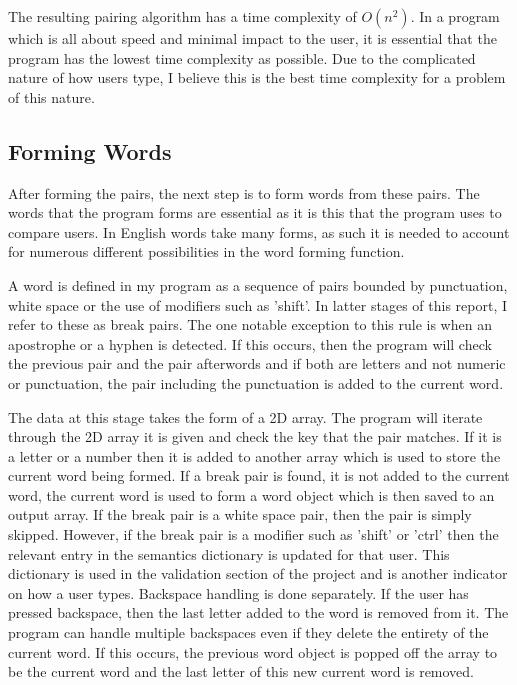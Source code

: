 \documentclass[10pt,a4paper]{report}
\begin{document}
The resulting pairing algorithm has a time complexity of \(O(n^2)\). In a program which is all about speed and minimal impact to the user, it is essential that the program has the lowest time complexity as possible. Due to the complicated nature of how users type, I believe this is the best time complexity for a problem of this nature.

\subsection{Forming Words}

After forming the pairs, the next step is to form words from these pairs. The words that the program forms are essential as it is this that the program uses to compare users. In English words take many forms, as such it is needed to account for numerous different possibilities in the word forming function.

A word is defined in my program as a sequence of pairs bounded by punctuation, white space or the use of modifiers such as 'shift'. In latter stages of this report, I refer to these as break pairs. The one notable exception to this rule is when an apostrophe or a hyphen is detected. If this occurs, then the program will check the previous pair and the pair afterwords and if both are letters and not numeric or punctuation, the pair including the punctuation is added to the current word. 

The data at this stage takes the form of a 2D array. The program will iterate through the 2D array it is given and check the key that the pair matches. If it is a letter or a number then it is added to another array which is used to store the current word being formed. If a break pair is found, it is not added to the current word, the current word is used to form a word object which is then saved to an output array. If the break pair is a white space pair, then the pair is simply skipped. However, if the break pair is a modifier such as 'shift' or 'ctrl' then the relevant entry in the semantics dictionary is updated for that user. This dictionary is used in the validation section of the project and is another indicator on how a user types. Backspace handling is done separately. If the user has pressed backspace, then the last letter added to the word is removed from it. The program can handle multiple backspaces even if they delete the entirety of the current word. If this occurs, the previous word object is popped off the array to be the current word and the last letter of this new current word is removed.
\end{document}
